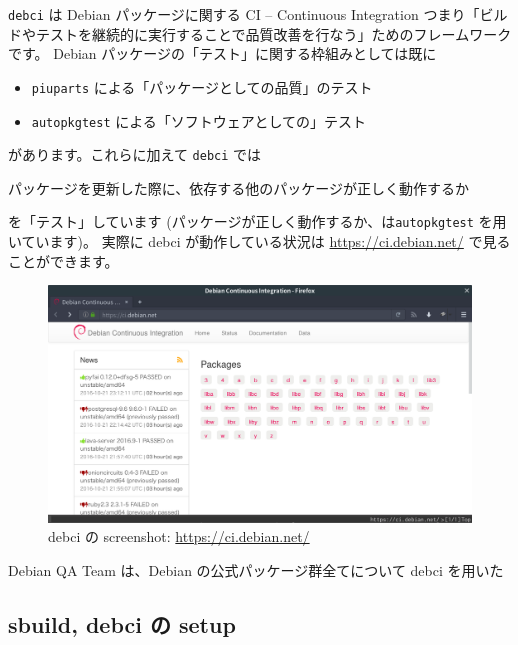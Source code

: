 \documentclass[mingoth,a4paper]{jsarticle}
\begin{document}
\texttt{debci} は Debian パッケージに関する
CI -- Continuous Integration
つまり「ビルドやテストを継続的に実行することで品質改善を行なう」ためのフレームワークです。
%
Debian パッケージの「テスト」に関する枠組みとしては既に
\begin{itemize}
\item %
  \texttt{piuparts} による「パッケージとしての品質」のテスト
\item %
  \texttt{autopkgtest} による「ソフトウェアとしての」テスト
\end{itemize}
があります。これらに加えて
\texttt{debci} では
\begin{center}
  パッケージを更新した際に、依存する他のパッケージが正しく動作するか
\end{center}
を「テスト」しています
(パッケージが正しく動作するか、は\texttt{autopkgtest} を用いています)。
%
実際に debci が動作している状況は
\url{https://ci.debian.net/} で見ることができます。
\begin{figure}[ht!]
  \centering
  \includegraphics[height=.25\textheight]{image201610/screenshot-debci.png}
  \caption{debci の screenshot: \url{https://ci.debian.net/}}
\end{figure}

Debian QA Team は、Debian の公式パッケージ群全てについて debci を用いた

\subsection{sbuild, debci の setup}
\end{document}
